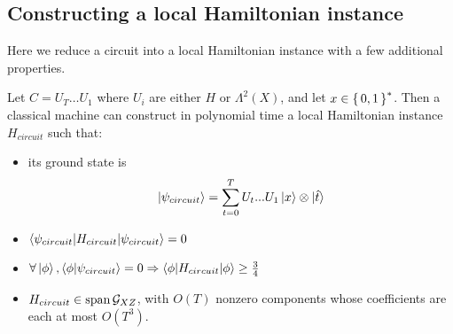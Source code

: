 \subsection{Constructing a local Hamiltonian instance}

Here we reduce a circuit into a local Hamiltonian instance with a few additional properties.

\begin{theorem}
	Let $C=U_T\ldots U_1$ where $U_i$ are either $H$ or $\Lambda^2(X)$, and let $x\in\set{0, 1}^*$. Then a classical machine can construct in polynomial time a local Hamiltonian instance $H_{circuit}$ such that:
	\begin{itemize}
		\item its ground state is $$\ket{\psi_{circuit}}=\sum_{t=0}^TU_t...U_1\ket{x}\otimes\ket{\hat{t}}$$
		\item $\braket{\psi_{circuit}|H_{circuit}|\psi_{circuit}}=0$
		\item $\forall\ket\phi,\braket{\phi|\psi_{circuit}}=0\Rightarrow\braket{\phi|H_{circuit}|\phi}\geq\frac{3}{4}$
		\item $H_{circuit}\in\operatorname*{\operatorname{span}}\mathcal{G}_{XZ}$, with $O(T)$ nonzero components whose coefficients are each at most $O(T^3)$.
	\end{itemize}
\end{theorem}

